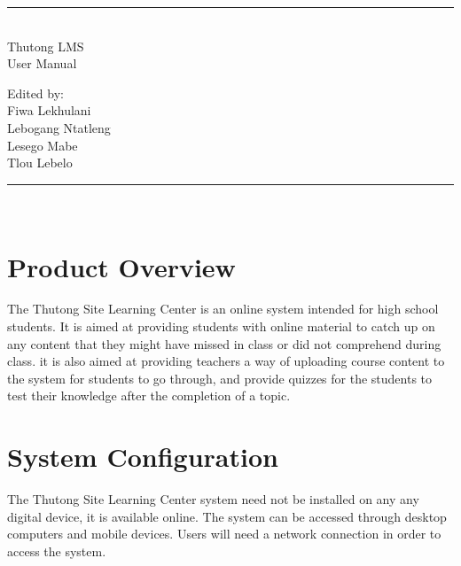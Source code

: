 \documentclass[12pt,a4paper]{article}
\begin{document}
	\begin{titlepage}
		
		\centering
		\vspace*{\fill}
		
		\vspace*{0.5cm}
		
		\huge\bfseries
		\rule{\textwidth}{1.6pt}\\[\baselineskip]
		Thutong LMS\\ User Manual
		
		\vspace*{0.5cm}
		
		\large Edited by: \\[\baselineskip]
		
			{Fiwa Lekhulani\\Lebogang Ntatleng\\Lesego Mabe\\Tlou Lebelo}
		
		\rule{\textwidth}{1.6pt}\\[\baselineskip]
		
		
		\vspace*{\fill}
	\end{titlepage}


	\date{\textbf{\today}}
	\pagebreak
	\tableofcontents
	\newpage


	\section{Product Overview}
		The Thutong Site Learning Center is an online system intended for high school students. It is aimed at providing students with online material to catch up on any content that they might have missed in class or did not comprehend during class. it is also aimed at providing teachers a way of uploading course content to the system for students to go through, and provide quizzes for the students to test their knowledge after the completion of a topic. 
	
	\section{System Configuration}
		The Thutong Site Learning Center system need not be installed on any any digital device, it is available online. The system can be accessed through desktop computers and mobile devices. Users will need a network connection in order to access the system. 
		
\end{document}
